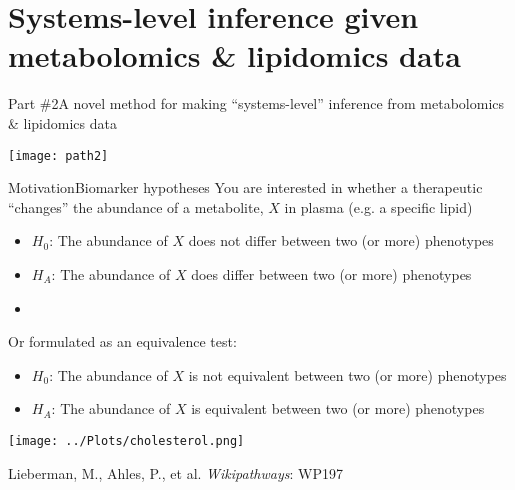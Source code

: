 \documentclass[xcolor=dvipsnames]{beamer}
\begin{document}
\section{Systems-level inference given metabolomics \& lipidomics data}
\begin{frame}{Part \#2}{A novel method for making ``systems-level'' inference from metabolomics \& lipidomics data}
\vspace{-15pt}
\begin{center}
	\texttt{[image: path2]}
\end{center}
\end{frame}

\begin{frame}{Motivation}{Biomarker hypotheses}
	\vspace{-10pt}
	You are interested in whether a therapeutic ``changes'' the abundance of a metabolite, $X$ in plasma (e.g. a specific lipid) \pause
	\begin{itemize}
		\item $H_0$: The abundance of $X$ does not differ between two (or more) phenotypes \pause
		\item $H_A$: The abundance of $X$ does differ between two (or more) phenotypes 
		\item[]
	\end{itemize} \pause
	
	Or formulated as an equivalence test:
	\begin{itemize}
		\item $H_0$: The abundance of $X$ is not equivalent between two (or more) phenotypes  
		\item $H_A$: The abundance of $X$ is equivalent between two (or more) phenotypes  
	\end{itemize}
\end{frame}

\begin{frame}
	\begin{center}
			\texttt{[image: ../Plots/cholesterol.png]}
			
			Lieberman, M., Ahles, P., et al. \emph{Wikipathways}: WP197
	\end{center}
\end{frame}
\end{document}
